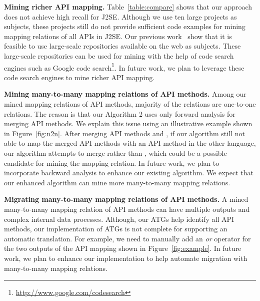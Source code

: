 \textbf{Mining richer API mapping.} Table~\ref{table:compare} shows
that our approach does not achieve high recall for J2SE. Although we
use ten large projects as subjects, these projects still do not
provide sufficient code examples for mining mapping relations of all
APIs in J2SE. Our previous
work~\cite{thummalapenta07parseweb,thummalapentaase08spotweb} show
that it is feasible to use large-scale repositories available on the
web as subjects. These large-scale repositories can be used for
mining with the help of code search engines such as Google code
search\footnote{\url{http://www.google.com/codesearch}}. In future
work, we plan to leverage these code search engines to mine richer
API mapping.


\textbf{Mining many-to-many mapping relations of API methods.}
Among our mined mapping relations of API methods, majority of
the relations are one-to-one relations. The reason is that our Algorithm 2
uses only forward analysis for merging API methods. We explain this
issue using an illustrative example shown in Figure~\ref{fig:n2n}.
After merging API methods  and ,
if our algorithm still not able to map the merged API methods with an API method in the
other language, our algorithm attempts to merge  rather than
, which could be a possible candidate for mining
the mapping relation. In future work, we plan to incorporate
backward analysis to enhance our existing algorithm. We expect
that our enhanced algorithm can mine more many-to-many mapping relations.

\textbf{Migrating many-to-many mapping relations of API methods.}
A mined many-to-many mapping relation of API methods can have multiple outputs
and complex internal data processes. Although, our ATGs
help identify all API methods, our implementation of ATGs is not complete
for supporting an automatic translation. For example, we need to manually add an
\emph{or} operator for the two outputs of the API mapping shown in
Figure~\ref{fig:example}. In future work, we plan to enhance our implementation to help
automate migration with many-to-many mapping relations.

